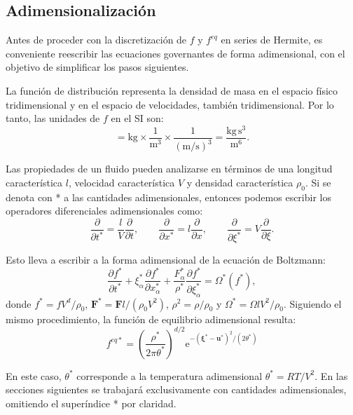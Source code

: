 \subsection{Adimensionalizaci\'on}
Antes de proceder con la discretizaci\'on de $f$ y $f^{eq}$ en series de Hermite, es conveniente reescribir las ecuaciones governantes de forma adimensional, con el objetivo de simplificar los pasos siguientes.
\par
La funci\'on de distribuci\'on \fvar{} representa la densidad de masa en el espacio f\'isico tridimensional y en el espacio de velocidades, tambi\'en tridimensional. Por lo tanto, las unidades de $f$ en el SI son:
\begin{equation}
	[f] = \mbox{kg} \times \dfrac{1}{\mbox{m}^3} \times \dfrac{1}{(\mbox{m/s})^3} = \dfrac{\mbox{kg} \, \mbox{s}^3}{\mbox{m}^6}.
\end{equation}

Las propiedades de un fluido pueden analizarse en t\'erminos de una longitud caracter\'istica $l$, velocidad caracter\'istica $V$ y densidad caracter\'istica $\rho_0$. Si se denota con * a las cantidades adimensionales, entonces podemos escribir los operadores diferenciales adimensionales como:
\begin{equation}
\dfrac{\partial}{\partial t^*} = \dfrac{l}{V}\dfrac{\partial}{\partial t}, \qquad
\dfrac{\partial}{\partial x^*} = l\dfrac{\partial}{\partial x}, \qquad
\dfrac{\partial}{\partial \xi^*} = V\dfrac{\partial}{\partial \xi}.
\end{equation}

Esto lleva a escribir a la forma adimensional de la ecuaci\'on de Boltzmann:
\begin{equation}
	\dfrac{\partial f^*}{\partial t^*}  
	+  \xi^*_{\alpha} \dfrac{\partial f^*}{\partial x^*_{\alpha}} 
	+  \dfrac{F^*_{\alpha}}{\rho^*} \dfrac{\partial f^*}{\partial \xi^*_{\alpha}} =\Omega^*(f^*),
	\label{eq:boltz_adim}
\end{equation}
donde $f^* = fV^d/\rho_0$, $\bm{F}^* = \bm{F}l/(\rho_0 V^2)$, $\rho^2 = \rho/\rho_0$ y $\Omega^*= \Omega l V^2 / \rho_0$. Siguiendo el mismo procedimiento, la funci\'on de equilibrio adimensional resulta:
\begin{equation}
	f^{eq*}	= \left( \dfrac{\rho^*}{2\pi \theta^*} \right)^{d/2} \mbox{e}^{-(\bm{\xi}^* - \bm{u}^*)^2/(2\theta^*)}
\end{equation}

En este caso, $\theta^*$ corresponde a la temperatura adimensional $\theta^*=RT/V^2$. En las secciones siguientes se trabajar\'a exclusivamente con cantidades adimensionales, omitiendo el super\'indice * por claridad.


